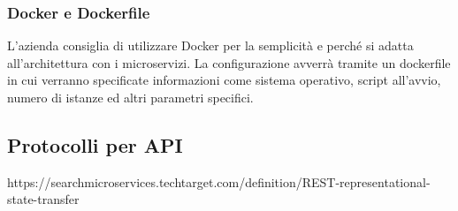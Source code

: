 		
		\subsubsection{Docker e Dockerfile}
		L'azienda consiglia di utilizzare Docker per la semplicità e perché si adatta all'architettura con i microservizi.
		La configurazione avverrà tramite un dockerfile in cui verranno specificate informazioni come sistema operativo, script all'avvio, numero di istanze ed altri parametri specifici.
			
	\subsection{Protocolli per API}
	https://searchmicroservices.techtarget.com/definition/REST-representational-state-transfer